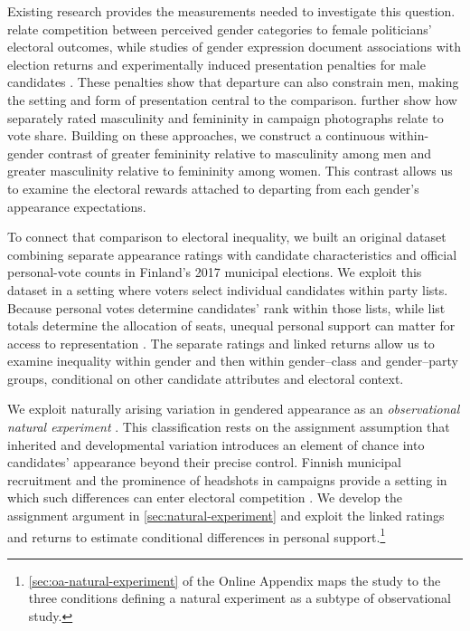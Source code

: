 \documentclass[11pt,a4paper]{article}\usepackage[]{graphicx}\usepackage[]{xcolor}
\begin{document}
Existing research provides the measurements needed to investigate this question. \textcite{Hehman2014} relate competition between perceived gender categories to female politicians' electoral outcomes, while studies of gender expression document associations with election returns \parencite{Wojcik2024} and experimentally induced presentation penalties for male candidates \parencite{Naunov2026}. These penalties show that departure can also constrain men, making the setting and form of presentation central to the comparison. \textcite{Park2023} further show how separately rated masculinity and femininity in campaign photographs relate to vote share. Building on these approaches, we construct a continuous within-gender contrast of greater femininity relative to masculinity among men and greater masculinity relative to femininity among women. This contrast allows us to examine the electoral rewards attached to departing from each gender's appearance expectations.

To connect that comparison to electoral inequality, we built an original dataset combining separate appearance ratings with candidate characteristics and official personal-vote counts in Finland's 2017 municipal elections. We exploit this dataset in a setting where voters select individual candidates within party lists. Because personal votes determine candidates' rank within those lists, while list totals determine the allocation of seats, unequal personal support can matter for access to representation \parencite{Bahamonde2024,HolliWass2010,SoderlundVonSchoultz2024}. The separate ratings and linked returns allow us to examine inequality within gender and then within gender--class and gender--party groups, conditional on other candidate attributes and electoral context.


We exploit naturally arising variation in gendered appearance as an \emph{observational natural experiment} \parencite[118--119]{Titiunik2021}. This classification rests on the assignment assumption that inherited and developmental variation introduces an element of chance into candidates' appearance beyond their precise control. Finnish municipal recruitment and the prominence of headshots in campaigns provide a setting in which such differences can enter electoral competition \parencite[628--629]{Bahamonde2024}. We develop the assignment argument in \autoref{sec:natural-experiment} and exploit the linked ratings and returns to estimate conditional differences in personal support.\footnote{\autoref{sec:oa-natural-experiment} of the Online Appendix maps the study to the three conditions defining a natural experiment as a subtype of observational study.}
\end{document}
